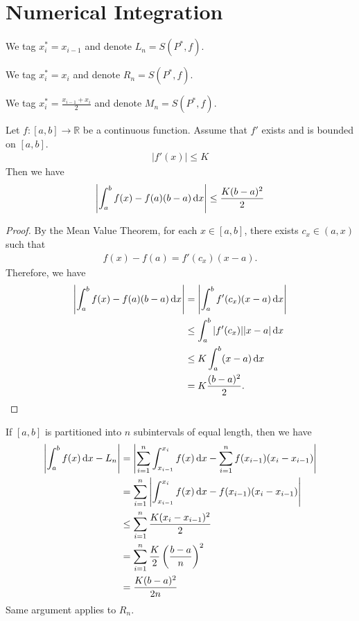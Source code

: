 \section{Numerical Integration}

\begin{definition} 
    We tag $x_i^* = x_{i-1}$ and denote $L_n = S(P^*, f)$.
\end{definition}
\begin{definition} 
    We tag $x_i^* = x_i$ and denote $R_n = S(P^*, f)$.
\end{definition}
\begin{definition} 
    We tag $x_i^* = \frac{x_{i-1} + x_i}{2}$ and denote $M_n = S(P^*, f)$.
\end{definition}

\begin{theorem}
    Let $f:[a,b] \to \mathbb{R}$ be a continuous function. Assume that $f'$ exists and is bounded on $[a,b]$. 
    \begin{align*}
        |f'(x)| \le K
    \end{align*}
    Then we have
    \begin{align*}
        \left|\int_{a}^{b} f(x) - f(a)(b-a) \operatorname*{d\!} x\right|\le \frac{K(b-a)^2}{2}
    \end{align*}
\end{theorem}
\begin{proof}
    By the Mean Value Theorem, for each $x \in [a,b]$, there exists $c_x \in (a,x)$ such that
    \begin{align*}
        f(x) - f(a) = f'(c_x)(x-a).
    \end{align*}
    Therefore, we have
    \begin{align*}
        \left|\int_{a}^{b} f(x) - f(a)(b-a) \operatorname*{d\!} x\right| &= \left|\int_{a}^{b} f'(c_x)(x-a) \operatorname*{d\!} x\right|\\
        &\le \int_{a}^{b} |f'(c_x)| |x-a| \operatorname*{d\!} x\\
        &\le K\int_{a}^{b} (x-a) \operatorname*{d\!} x\\
        &= K\frac{(b-a)^2}{2}.
    \end{align*}
\end{proof}

\begin{corollary}
    If $[a,b]$ is partitioned into $n$ subintervals of equal length, then we have
    \begin{align*}
        \left|\int_{a}^{b} f(x) \operatorname*{d\!} x - L_n\right| &= \left|\sum_{i=1}^{n}\int_{x_{i-1}}^{x_i} f(x) \operatorname*{d\!} x - \sum_{i=1}^{n} f(x_{i-1})(x_i - x_{i-1})\right| \\
        &= \sum_{i=1}^{n}\left|\int_{x_{i-1}}^{x_i} f(x) \operatorname*{d\!} x - f(x_{i-1})(x_i - x_{i-1})\right| \\    
        &\le \sum_{i=1}^{n}\frac{K(x_i - x_{i-1})^2}{2} \\
        &= \sum_{i=1}^{n}\frac{K}{2}\left(\frac{b-a}{n}\right)^2 \\
        &= \frac{K(b-a)^2}{2n}
    \end{align*}
    Same argument applies to $R_n$.
\end{corollary}

